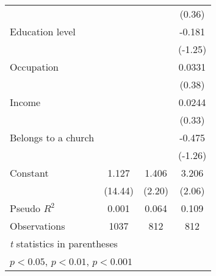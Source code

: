 {\begin{tabular}{l*{3}{c}}
                &                  &                  &   (0.36)         \\
Education level &                  &                  &   -0.181         \\
                &                  &                  &  (-1.25)         \\
Occupation      &                  &                  &   0.0331         \\
                &                  &                  &   (0.38)         \\
Income          &                  &                  &   0.0244         \\
                &                  &                  &   (0.33)         \\
Belongs to a church&                  &                  &   -0.475         \\
                &                  &                  &  (-1.26)         \\
Constant        &    1.127\sym{***}&    1.406\sym{*}  &    3.206\sym{*}  \\
                &  (14.44)         &   (2.20)         &   (2.06)         \\
\midrule
Pseudo \(R^{2}\)&    0.001         &    0.064         &    0.109         \\
Observations    &     1037         &      812         &      812         \\
\bottomrule
\multicolumn{4}{l}{\footnotesize \textit{t} statistics in parentheses}\\
\multicolumn{4}{l}{\footnotesize \sym{*} \(p<0.05\), \sym{**} \(p<0.01\), \sym{***} \(p<0.001\)}\\
\end{tabular}
}

